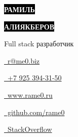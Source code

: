 \documentclass[10pt]{tpl/developercv} %
\begin{document}

\begin{minipage}[t]{0.44\textwidth} %
	\vspace{-\baselineskip} %

	\colorbox{black}{{\Huge\textcolor{white}{\textbf{\MakeUppercase{Рамиль}}}}} %

	\colorbox{black}{{\Huge\textcolor{white}{\textbf{\MakeUppercase{Алиякберов}}}}} %

	\vspace{6pt}

	{\huge Full stack разработчик} %
\end{minipage}
\begin{minipage}[t]{0.275\textwidth} %
	\vspace{-\baselineskip} %


	\href{mailto:r@me0.biz}{\ r@me0.biz}

	\href{tel:+79253943150}{\ +7 925 394-31-50}
\end{minipage}
\begin{minipage}[t]{0.275\textwidth} %
	\vspace{-\baselineskip} %

	\href{https://www.rame0.ru/}{\ www.rame0.ru}

	\href{https://github.com/rame0}{\ github.com/rame0}

	\href{https://stackoverflow.com/users/513723/rame0}{\ StackOverflow}
\end{minipage}
\end{document}
